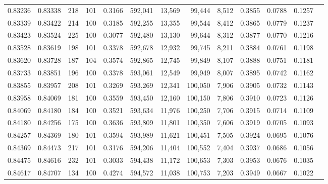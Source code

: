 \begin{tabular}{rrrrrrrrrrrrr}
0.83236 & 0.83338 &   218 & 101 &                                     0.3166 & 592,041 &  13,569 &  99,444 &   8,512 & 0.3855 & 0.0788 & 0.1257 \\
0.83339 & 0.83422 &   214 & 100 &                                     0.3185 & 592,255 &  13,355 &  99,544 &   8,412 & 0.3865 & 0.0779 & 0.1237 \\
0.83423 & 0.83524 &   225 & 100 &                                     0.3077 & 592,480 &  13,130 &  99,644 &   8,312 & 0.3877 & 0.0770 & 0.1216 \\
0.83528 & 0.83619 &   198 & 101 &                                     0.3378 & 592,678 &  12,932 &  99,745 &   8,211 & 0.3884 & 0.0761 & 0.1198 \\
0.83620 & 0.83728 &   187 & 104 &                                     0.3574 & 592,865 &  12,745 &  99,849 &   8,107 & 0.3888 & 0.0751 & 0.1181 \\
0.83733 & 0.83851 &   196 & 100 &                                     0.3378 & 593,061 &  12,549 &  99,949 &   8,007 & 0.3895 & 0.0742 & 0.1162 \\
0.83855 & 0.83957 &   208 & 101 &                                     0.3269 & 593,269 &  12,341 & 100,050 &   7,906 & 0.3905 & 0.0732 & 0.1143 \\
0.83958 & 0.84069 &   181 & 100 &                                     0.3559 & 593,450 &  12,160 & 100,150 &   7,806 & 0.3910 & 0.0723 & 0.1126 \\
0.84069 & 0.84180 &   184 & 100 &                                     0.3521 & 593,634 &  11,976 & 100,250 &   7,706 & 0.3915 & 0.0714 & 0.1109 \\
0.84180 & 0.84256 &   175 & 100 &                                     0.3636 & 593,809 &  11,801 & 100,350 &   7,606 & 0.3919 & 0.0705 & 0.1093 \\
0.84257 & 0.84369 &   180 & 101 &                                     0.3594 & 593,989 &  11,621 & 100,451 &   7,505 & 0.3924 & 0.0695 & 0.1076 \\
0.84369 & 0.84473 &   217 & 101 &                                     0.3176 & 594,206 &  11,404 & 100,552 &   7,404 & 0.3937 & 0.0686 & 0.1056 \\
0.84475 & 0.84616 &   232 & 101 &                                     0.3033 & 594,438 &  11,172 & 100,653 &   7,303 & 0.3953 & 0.0676 & 0.1035 \\
0.84617 & 0.84707 &   134 & 100 &                                     0.4274 & 594,572 &  11,038 & 100,753 &   7,203 & 0.3949 & 0.0667 & 0.1022 \\

\end{tabular}
